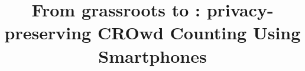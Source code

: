 \documentclass[USenglish]{IEEEtran}
\begin{document}

\title{%
  From grassroots to \PRIVO: privacy-preserving CROwd Counting Using Smartphones %
}


\end{document}
